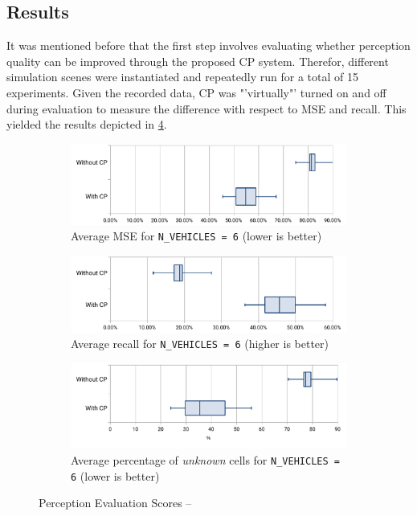 \subsection{Results}
\label{subsec:evaluation:perception_evaluation:results}
It was mentioned before that the first step involves evaluating whether perception quality can be improved through the proposed CP system. Therefor, different simulation scenes were instantiated and repeatedly run for a total of 15 experiments. Given the recorded data, CP was "'virtually"' turned on and off during evaluation to measure the difference with respect to MSE and recall. This yielded the results depicted in \cref{fig:perception_evalutation_scores_1}.

\begin{figure}
	\centering
	\begin{subfigure}[b]{1\textwidth}
		\includegraphics[width=1\linewidth]{98_images/eval_boxplot_2}
		\caption{Average MSE for \texttt{N\_VEHICLES = 6} (lower is better)}
		\label{fig:eval_boxplot_2} 
	\end{subfigure}
	
	\begin{subfigure}[b]{1\textwidth}
		\includegraphics[width=1\linewidth]{98_images/eval_boxplot_3}
		\caption{Average recall for \texttt{N\_VEHICLES = 6} (higher is better)}
		\label{fig:eval_boxplot_3}
	\end{subfigure}

	\begin{subfigure}[b]{1\textwidth}
		\includegraphics[width=1\linewidth]{98_images/eval_boxplot_1}
		\caption{Average percentage of \textit{unknown} cells for \texttt{N\_VEHICLES = 6} (lower is better)}
		\label{fig:eval_boxplot_1}
	\end{subfigure}
	\caption{Perception Evaluation Scores – }
	\label{fig:perception_evalutation_scores_1}
\end{figure}

